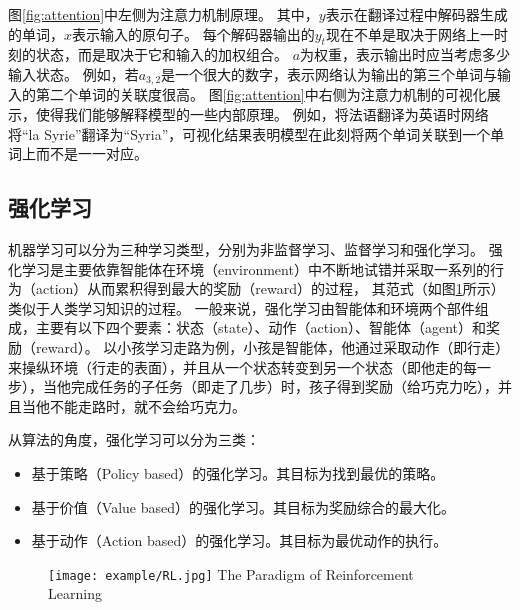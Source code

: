 图\ref{fig:attention}中左侧为注意力机制原理。
其中，$y$表示在翻译过程中解码器生成的单词，$x$表示输入的原句子。
每个解码器输出的$y_t$现在不单是取决于网络上一时刻的状态，而是取决于它和输入的加权组合。
$a$为权重，表示输出时应当考虑多少输入状态。
例如，若$a_{3,2}$是一个很大的数字，表示网络认为输出的第三个单词与输入的第二个单词的关联度很高。
图\ref{fig:attention}中右侧为注意力机制的可视化展示，使得我们能够解释模型的一些内部原理。
例如，将法语翻译为英语时网络将“la Syrie”翻译为“Syria”，可视化结果表明模型在此刻将两个单词关联到一个单词上而不是一一对应。


\subsection{强化学习}

机器学习可以分为三种学习类型，分别为非监督学习、监督学习和强化学习。
强化学习是主要依靠智能体在环境（environment）中不断地试错并采取一系列的行为（action）从而累积得到最大的奖励（reward）的过程，
其范式（如图\ref{fig:RL}所示）类似于人类学习知识的过程。
一般来说，强化学习由智能体和环境两个部件组成，主要有以下四个要素：状态（state）、动作（action）、智能体（agent）和奖励（reward）。
以小孩学习走路为例，小孩是智能体，他通过采取动作（即行走）来操纵环境（行走的表面），并且从一个状态转变到另一个状态（即他走的每一步），当他完成任务的子任务（即走了几步）时，孩子得到奖励（给巧克力吃），并且当他不能走路时，就不会给巧克力。

从算法的角度，强化学习可以分为三类：
\begin{itemize}
  \item 基于策略（Policy based）的强化学习。其目标为找到最优的策略。
  \item 基于价值（Value based）的强化学习。其目标为奖励综合的最大化。
  \item 基于动作（Action based）的强化学习。其目标为最优动作的执行。
\end{itemize}
\begin{figure}[!htp]
  \centering
  \texttt{[image: example/RL.jpg]}
    {The Paradigm of Reinforcement Learning}
  \label{fig:RL}
\end{figure}




